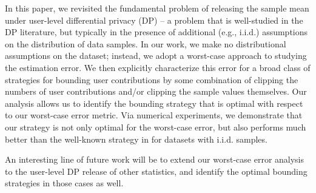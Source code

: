 \label{sec:conclusion}
In this paper, we revisited the fundamental problem of releasing the sample mean under user-level differential privacy (DP) -- a problem that is well-studied in the DP literature, but typically in the presence of additional (e.g., i.i.d.) assumptions on the distribution of data samples. In our work, we make no distributional assumptions on the dataset; instead, we adopt a worst-case approach to studying the estimation error. We then explicitly characterize this error for a broad class of strategies for bounding user contributions by some combination of clipping the numbers of user contributions and/or clipping the sample values themselves. Our analysis allows us to identify the bounding strategy that is optimal with respect to our worst-case error metric. Via numerical experiments, we demonstrate that our strategy is not only optimal for the worst-case error, but also performs much better than the well-known strategy in \cite{amin} for datasets with i.i.d. samples.

An interesting line of future work will be to extend our worst-case error analysis to the user-level DP release of other statistics, and identify the optimal bounding strategies in those cases as well.